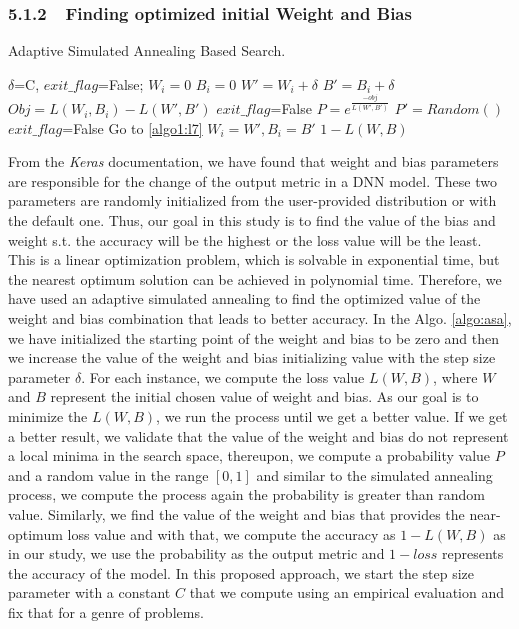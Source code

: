 \subsubsection{5.1.2~~Finding optimized initial Weight and Bias}
\begin{algorithm}
	\footnotesize
	\caption{\footnotesize Adaptive Simulated Annealing Based Search.}
	\label{algo:asa}
	\begin{algorithmic}[1]
		\State $\delta$=C, $exit\_flag$=False;
		\label{algo1:l3}
		\State $W_i=0$\label{algo1:l4}
		\State $B_i=0$\label{algo1:l5}
		\label{algo1:l7}
		\State $W'=W_i+\delta$
		\State $B'=B_i+\delta$
		\State $Obj=L(W_i,B_i)-L(W',B')$
		\State $exit\_flag$=False
		\Else
		\State $P=e^{\frac{-obj}{L(W',B')}}$
		\State $P'=Random()$
		\State  $exit\_flag$=False
		\EndIf
		\EndIf
		\Else
		\State Go to \ref{algo1:l7}
		\EndIf
		\EndWhile
		\State $W_i=W', B_i=B'$
		\EndFor\label{algo1:l6}
		\State \Return $1-L(W,B)$\label{algo2:l12}
		\EndProcedure\label{algo2:l13}
	\end{algorithmic} 
\end{algorithm}
From the \emph{Keras} documentation, we have found that weight and bias parameters are responsible for the change of the output metric in a DNN model. These two parameters are randomly initialized from the user-provided distribution or with the default one. Thus, our goal in this study is to find the value of the bias and weight s.t. the accuracy will be the highest or the loss value will be the least. This is a linear optimization problem, which is solvable in exponential time, but the nearest optimum solution can be achieved in polynomial time. Therefore, we have used an adaptive simulated annealing \cite{ingber2000adaptive} to find the optimized value of the weight and bias combination that leads to better accuracy. 
In the Algo. \ref{algo:asa}, we have initialized the starting point of the weight and bias to be zero and then we increase the value of the weight and bias initializing value with the step size parameter $\delta$. For each instance, we compute the loss value $L(W, B)$, where $W$ and $B$ represent the initial chosen value of weight and bias. As our goal is to minimize the $L(W, B)$, we run the process until we get a better value. If we get a better result, we validate that the value of the weight and bias do not represent a local minima in the search space, thereupon, we compute a probability value $P$ and a random value in the range $[0,1]$ and similar to the simulated annealing process, we compute the process again the probability is greater than random value. Similarly, we find the value of the weight and bias that provides the near-optimum loss value and with that, we compute the accuracy as $1-L(W, B)$ as in our study, we use the probability as the output metric and $1-loss$ represents the accuracy of the model. In this proposed approach, we start the step size parameter with a constant $C$ that we compute using an empirical evaluation and fix that for a genre of problems.
